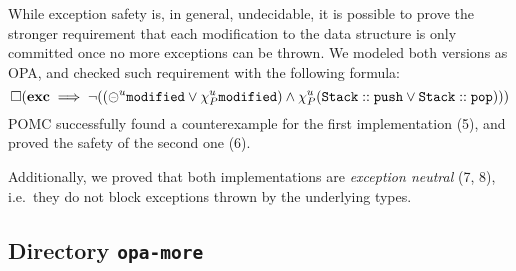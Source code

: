 \documentclass{article}
\begin{document}
While exception safety is, in general, undecidable, it is possible to
prove the stronger requirement that each modification to the data
structure is only committed once no more exceptions can be thrown.
We modeled both versions as OPA, and checked
such requirement with the following formula:
\[
\square (\mathbf{exc} \implies
         \neg ((\circleddash^u \mathtt{modified} \lor
               \chi_P^{u} \mathtt{modified})
         \land \chi_P^{u} (\mathtt{Stack::push} \lor \mathtt{Stack::pop})))
\]
POMC successfully found a counterexample for the first implementation (5),
and proved the safety of the second one (6).

Additionally, we proved that both implementations are
\emph{exception neutral} (7, 8), i.e.\ they do not block exceptions
thrown by the underlying types.


\subsection{Directory \texttt{opa-more}}
\end{document}
